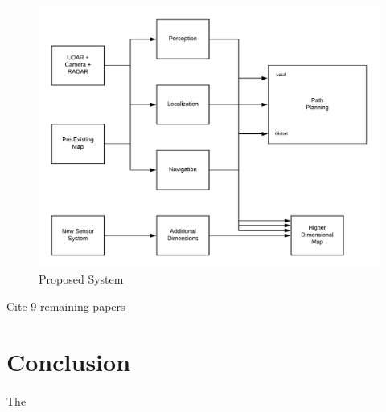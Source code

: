 \documentclass{article}
\begin{document}
	
			\begin{figure}[H]
			\includegraphics[width=\textwidth]{HERE_Proposed_System}
			\caption{Proposed System}
			\end{figure}
	
	
	Cite 9 remaining papers
	\section{Conclusion}
	\paragraph{}
	The
	
	
	


\end{document}
